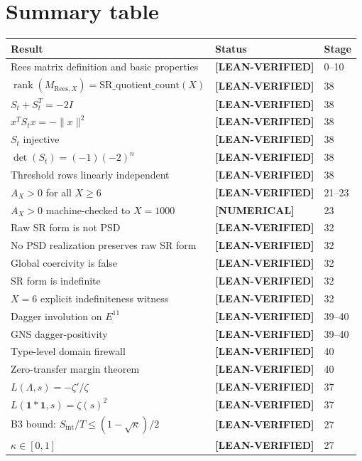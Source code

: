 \documentclass[11pt]{article}
\theoremstyle{remark}
\newcommand{\LEANVERIFIED}{\textbf{\color{green!60!black}[LEAN-VERIFIED]}}
\newcommand{\NUMERICAL}{\textbf{\color{orange}[NUMERICAL]}}
\begin{document}
\section{Summary table}

\begin{longtable}{p{8cm}ll}
\toprule
Result & Status & Stage \\
\midrule
Rees matrix definition and basic properties & \LEANVERIFIED{} & 0--10 \\
$\operatorname{rank}(M_{\mathrm{Rees},X}) = \mathrm{SR\_quotient\_count}(X)$ & \LEANVERIFIED{} & 38 \\
$S_t + S_t^T = -2I$ & \LEANVERIFIED{} & 38 \\
$x^T S_t x = -\|x\|^2$ & \LEANVERIFIED{} & 38 \\
$S_t$ injective & \LEANVERIFIED{} & 38 \\
$\det(S_t) = (-1)(-2)^n$ & \LEANVERIFIED{} & 38 \\
Threshold rows linearly independent & \LEANVERIFIED{} & 38 \\
$A_X > 0$ for all $X \geq 6$ & \LEANVERIFIED{} & 21--23 \\
$A_X > 0$ machine-checked to $X=1000$ & \NUMERICAL{} & 23 \\
Raw SR form is not PSD & \LEANVERIFIED{} & 32 \\
No PSD realization preserves raw SR form & \LEANVERIFIED{} & 32 \\
Global coercivity is false & \LEANVERIFIED{} & 32 \\
SR form is indefinite & \LEANVERIFIED{} & 32 \\
$X=6$ explicit indefiniteness witness & \LEANVERIFIED{} & 32 \\
Dagger involution on $E^{11}$ & \LEANVERIFIED{} & 39--40 \\
GNS dagger-positivity & \LEANVERIFIED{} & 39--40 \\
Type-level domain firewall & \LEANVERIFIED{} & 40 \\
Zero-transfer margin theorem & \LEANVERIFIED{} & 40 \\
$L(\Lambda,s) = -\zeta'/\zeta$ & \LEANVERIFIED{} & 37 \\
$L(\mathbf{1}*\mathbf{1},s) = \zeta(s)^2$ & \LEANVERIFIED{} & 37 \\
B3 bound: $S_{\mathrm{int}}/T \leq (1-\sqrt{\kappa})/2$ & \LEANVERIFIED{} & 27 \\
$\kappa \in [0,1]$ & \LEANVERIFIED{} & 27 \\

\end{longtable}
\end{document}
